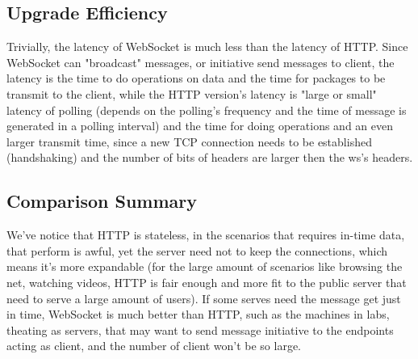 \documentclass[onecolumn, oneside, ctexart]{SUSTechHomework}
\begin{document}
\subsection{Upgrade Efficiency}
Trivially, the latency of WebSocket is much less than the latency of HTTP. Since WebSocket can "broadcast" messages, or initiative send messages to client, the latency is the time to do operations on data and the time for packages to be transmit to the client, while the HTTP version's latency is "large or small" latency of polling (depends on the polling's frequency and the time of message is generated in a polling interval) and the time for doing operations and an even larger transmit time, since a new TCP connection needs to be established (handshaking) and the number of bits of headers are larger then the ws's headers.

\subsection{Comparison Summary}
We've notice that HTTP is stateless, in the scenarios that requires in-time data, that perform is awful, yet the server need not to keep the connections, which means it's more expandable (for the large amount of scenarios like browsing the net, watching videos, HTTP is fair enough and more fit to the public server that need to serve a large amount of users). If some serves need the message get just in time, WebSocket is much better than HTTP, such as the machines in labs, theating as servers, that may want to send message initiative to the endpoints acting as client, and the number of client won't be so large.
\end{document}
